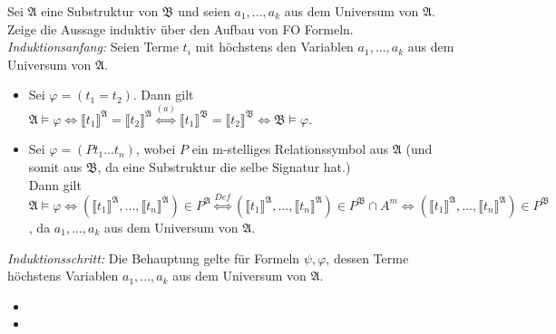 \documentclass[11pt, a4paper]{article}
\begin{document}
\begin{adjustwidth}{20pt}{20pt}
	Sei $\mathfrak{A}$ eine Substruktur von $\mathfrak{B}$ und seien $a_1,...,a_k$ aus dem Universum von $\mathfrak{A}$. Zeige die Aussage induktiv über den Aufbau von FO Formeln.\\
	\textit{Induktionsanfang:} Seien Terme $t_i$ mit höchstens den Variablen $a_1,...,a_k$ aus dem Universum von $\mathfrak{A}$.
	\begin{itemize}
	\item Sei $\varphi=(t_1=t_2)$. Dann gilt $\mathfrak{A} \models \varphi \Leftrightarrow \llbracket t_1 \rrbracket^\mathfrak{A} = \llbracket t_2 \rrbracket^\mathfrak{A}
			\overset{(a)}{\Leftrightarrow} \llbracket t_1 \rrbracket^\mathfrak{B} = \llbracket t_2 \rrbracket^\mathfrak{B} \Leftrightarrow \mathfrak{B} \models \varphi$.
	\item Sei $\varphi=(Pt_1...t_n)$, wobei $P$ ein m-stelliges Relationssymbol aus $\mathfrak{A}$ (und somit aus $\mathfrak{B}$, da eine Substruktur die selbe Signatur hat.)\\
		Dann gilt $\mathfrak{A} \models \varphi \Leftrightarrow (\llbracket t_1 \rrbracket^\mathfrak{A},...,\llbracket t_n \rrbracket^\mathfrak{A}) \in P^{\mathfrak{A}}
		\overset{Def}{\Leftrightarrow} (\llbracket t_1 \rrbracket^\mathfrak{A},...,\llbracket t_n \rrbracket^\mathfrak{A}) \in P^{\mathfrak{B}} \cap A^m \Leftrightarrow 
		(\llbracket t_1 \rrbracket^\mathfrak{A},...,\llbracket t_n \rrbracket^\mathfrak{A}) \in P^{\mathfrak{B}}$, da $a_1,...,a_k$ aus dem Universum von $\mathfrak{A}$.
	\end{itemize}
	\textit{Induktionsschritt:} Die Behauptung gelte für Formeln $\psi, \varphi$, dessen Terme höchstens Variablen $a_1,...,a_k$ aus dem Universum von $\mathfrak{A}$.
	\begin{itemize}
	\item 
	\item 
	\end{itemize}
\end{adjustwidth}
\end{document}
